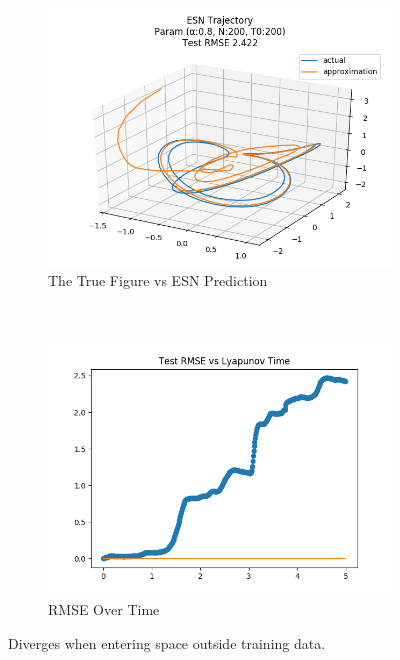 \documentclass{article}
\begin{document}
\begin{figure}[H]
    \centering
    \begin{subfigure}[b]{0.45\textwidth}
        \includegraphics[width=\textwidth]{doc/paper/images/lorenz/rank_0_param_225_fit.png}
        \caption{The True Figure vs ESN Prediction}
        \label{fig:lorenz_r0_fit}
    \end{subfigure}
    ~
    \begin{subfigure}[b]{0.45\textwidth}
        \includegraphics[width=\textwidth]{doc/paper/images/lorenz/rank_0_param_225_rmse.png}
        \caption{RMSE Over Time}
        \label{fig:lorenz_r0_rmse}
    \end{subfigure}
    \caption{Diverges when entering space outside training data.}
    \label{fig:lorenz_r0}
\end{figure}
\end{document}
